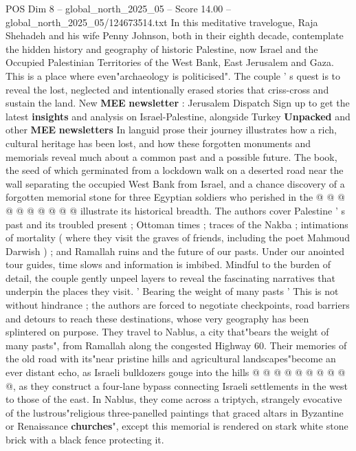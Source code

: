 \begin{textsample}{POS Dim 8 – global\_north\_2025\_05 – Score 14.00 – global\_north\_2025\_05/124673514.txt}  \label{ex:f8_pos_032}
In this meditative travelogue, Raja Shehadeh and his wife Penny Johnson, both in their eighth decade, contemplate the hidden history and geography of historic Palestine, now Israel and the Occupied Palestinian Territories of the West Bank, East Jerusalem and Gaza.
This is a place where even"archaeology is politicised".
The couple ' s quest is to reveal the lost, neglected and intentionally erased stories that criss-cross and sustain the land.
New \textbf{MEE} \textbf{newsletter} : Jerusalem Dispatch Sign up to get the latest \textbf{insights} and analysis on Israel-Palestine, alongside Turkey \textbf{Unpacked} and other \textbf{MEE} \textbf{newsletters} In languid prose their journey illustrates how a rich, cultural heritage has been lost, and how these forgotten monuments and memorials reveal much about a common past and a possible future.
The book, the seed of which germinated from a lockdown walk on a deserted road near the wall separating the occupied West Bank from Israel, and a chance discovery of a forgotten memorial stone for three Egyptian soldiers who perished in the @ @ @ @ @ @ @ @ @ @ illustrate its historical breadth.
The authors cover Palestine ' s past and its troubled present ; Ottoman times ; traces of the Nakba ; intimations of mortality ( where they visit the graves of friends, including the poet Mahmoud Darwish ) ; and Ramallah ruins and the future of our pasts.
Under our anointed tour guides, time slows and information is imbibed.
Mindful to the burden of detail, the couple gently unpeel layers to reveal the fascinating narratives that underpin the places they visit. ' Bearing the weight of many pasts ' This is not without hindrance ; the authors are forced to negotiate checkpoints, road barriers and detours to reach these destinations, whose very geography has been splintered on purpose.
They travel to Nablus, a city that"bears the weight of many pasts", from Ramallah along the congested Highway 60.
Their memories of the old road with its"near pristine hills and agricultural landscapes"become an ever distant echo, as Israeli bulldozers gouge into the hills @ @ @ @ @ @ @ @ @ @, as they construct a four-lane bypass connecting Israeli settlements in the west to those of the east.
In Nablus, they come across a triptych, strangely evocative of the lustrous"religious three-panelled paintings that graced altars in Byzantine or Renaissance \textbf{churches}", except this memorial is rendered on stark white stone brick with a black fence protecting it.

\end{textsample}
